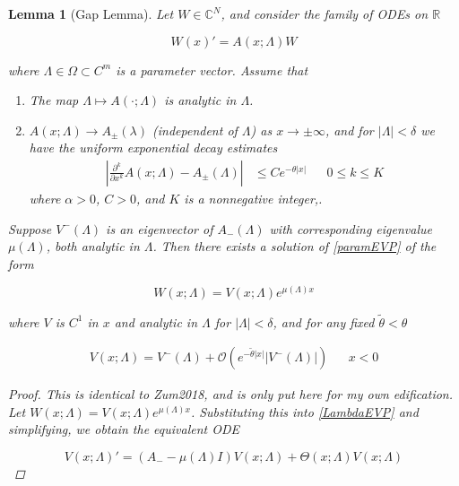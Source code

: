 \documentclass[12pt]{article}
\def\R{{\mathbb R}}
\def\C{{\mathbb C}}
\newtheorem{lemma}{Lemma}
\begin{document}
\begin{lemma}[Gap Lemma]\label{gaplemma}
Let $W \in \C^N$, and consider the family of ODEs on $\R$

\begin{equation}\label{LambdaEVP}
W(x)' = A(x; \Lambda) W
\end{equation}

where $\Lambda \in \Omega \subset C^m$ is a parameter vector. Assume that

\begin{enumerate}
	\item The map $\Lambda \mapsto A(\cdot; \Lambda)$ is analytic in $\Lambda$.
	\item $A(x; \Lambda) \rightarrow A_\pm(\lambda)$ (independent of $\Lambda$) as $x \rightarrow \pm \infty$, and for $|\Lambda| < \delta$ we have the uniform exponential decay estimates 
	\begin{align}
	\left| \frac{\partial^k}{\partial x^k} A(x; \Lambda) - A_\pm(\Lambda) \right| 
	&\leq C e^{-\theta |x|} && 0 \leq k \leq K
	\end{align}
	where $\alpha > 0$, $C > 0$, and $K$ is a nonnegative integer,.
\end{enumerate}

Suppose $V^-(\Lambda)$ is an eigenvector of $A_-(\Lambda)$ with corresponding eigenvalue $\mu(\Lambda)$, both analytic in $\Lambda$. Then there exists a solution of \ref{paramEVP} of the form 

\begin{equation}
W(x; \Lambda) = V(x; \Lambda) e^{\mu(\Lambda)x}
\end{equation}

where $V$ is $C^1$ in $x$ and analytic in $\Lambda$ for $|\Lambda| < \delta$, and for any fixed $\tilde{\theta} < \theta$

\begin{align}
V(x; \Lambda) = V^-(\Lambda) + \mathcal{O}(e^{-\tilde{\theta}|x|}|V^-(\Lambda)|) && x < 0
\end{align}

\begin{proof}
This is identical to Zum2018, and is only put here for my own edification.\\

Let $W(x; \Lambda) = V(x; \Lambda) e^{\mu(\Lambda) x}$. Substituting this into \eqref{LambdaEVP} and simplifying, we obtain the equivalent ODE

\begin{equation}\label{VEVP}
V(x; \Lambda)' = (A_- - \mu(\Lambda)I)V(x; \Lambda) + \Theta(x; \Lambda) V(x; \Lambda)
\end{equation}


\end{proof}
\end{lemma}
\end{document}
